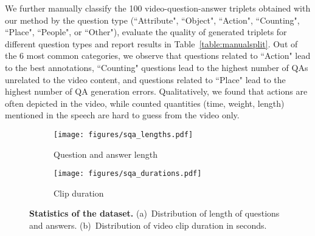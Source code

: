 We further manually classify the 100 video-question-answer triplets obtained with our method by the question type (``Attribute", ``Object", ``Action", ``Counting", ``Place", ``People", or ``Other"), evaluate the quality of generated triplets for different question types and report results in Table~\ref{table:manualsplit}.
Out of the 6 most common categories, we observe that questions related to ``Action" lead to the best annotations, ``Counting" questions lead to the highest number of QAs unrelated to the video content, and questions related to ``Place" lead to the highest number of QA generation errors. 
Qualitatively, we found that actions are often depicted in the video, while counted quantities (\eg time, weight, length) mentioned in the speech are hard to guess from the video only. 

\begin{figure}[t]
\centering
\begin{subfigure}{.5\textwidth}
\texttt{[image: figures/sqa\_lengths.pdf]}
\caption{Question and answer length}
\end{subfigure}
\begin{subfigure}{.5\textwidth}
\texttt{[image: figures/sqa\_durations.pdf]}
\caption{Clip duration}
\end{subfigure}
\vspace{-0.3cm}
\caption{{\bf Statistics of the \datasetname{} dataset.} (a)~Distribution of length of questions and answers. (b)~Distribution of video clip duration in seconds.}
\label{fig:sqa_length}
\vspace{-0.3cm}
\end{figure}

